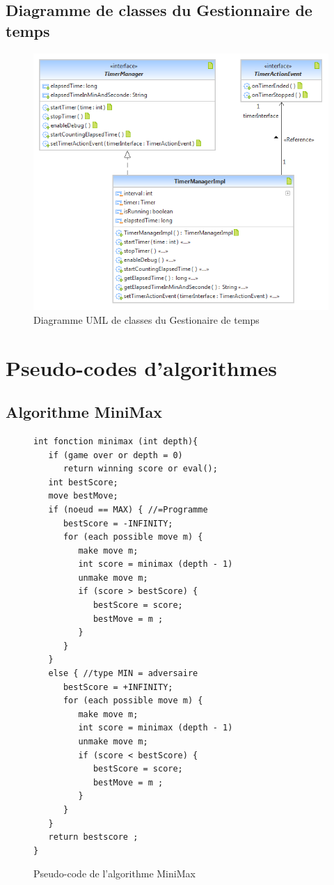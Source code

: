 \documentclass[a4paper,12pt]{report}
\begin{document}
\section{Diagramme de classes du Gestionnaire de temps}
\label{clsT}
\begin{figure}[H]
\centering
  \includegraphics[scale=0.8]{Architecture/PdpTimer.png}
\caption{Diagramme UML de classes du Gestionaire de temps}
\end{figure}

\chapter{Pseudo-codes d'algorithmes}
\lstset{language=C++,basicstyle=\ttfamily\scriptsize}     
\section{Algorithme MiniMax}
\begin{figure}[H]
\begin{lstlisting}[frame=single]
int fonction minimax (int depth){
   if (game over or depth = 0)
      return winning score or eval();
   int bestScore;
   move bestMove;
   if (noeud == MAX) { //=Programme
      bestScore = -INFINITY;
      for (each possible move m) {
         make move m;
         int score = minimax (depth - 1)
         unmake move m;
         if (score > bestScore) {
            bestScore = score;
            bestMove = m ;
         }
      }
   }
   else { //type MIN = adversaire
      bestScore = +INFINITY;
      for (each possible move m) {
         make move m;
         int score = minimax (depth - 1)
         unmake move m;
         if (score < bestScore) {
            bestScore = score;
            bestMove = m ;
         }
      }
   }
   return bestscore ;
}
\end{lstlisting}
\caption{Pseudo-code de l'algorithme MiniMax \cite{1}}
\label{codemin}
\end{figure}
\end{document}
